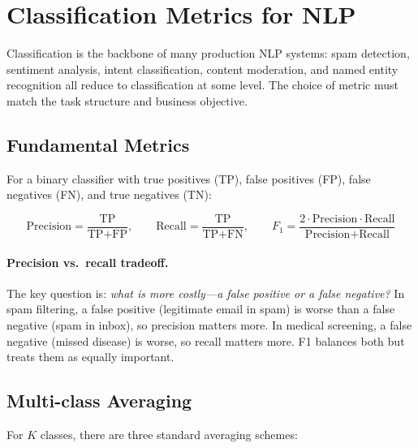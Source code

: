 \section{Classification Metrics for NLP}
\label{sec:classification_metrics}

Classification is the backbone of many production NLP systems: spam detection,
sentiment analysis, intent classification, content moderation, and named entity
recognition all reduce to classification at some level.  The choice of metric
must match the task structure and business objective.

\subsection{Fundamental Metrics}

For a binary classifier with true positives (TP), false positives (FP), false
negatives (FN), and true negatives (TN):

\[
    \text{Precision} = \frac{\text{TP}}{\text{TP} + \text{FP}}, \qquad
    \text{Recall} = \frac{\text{TP}}{\text{TP} + \text{FN}}, \qquad
    F_1 = \frac{2 \cdot \text{Precision} \cdot \text{Recall}}{\text{Precision} + \text{Recall}}
\]

\paragraph{Precision vs.\ recall tradeoff.}
The key question is: \emph{what is more costly---a false positive or a false
negative?}  In spam filtering, a false positive (legitimate email in spam) is
worse than a false negative (spam in inbox), so precision matters more.  In
medical screening, a false negative (missed disease) is worse, so recall matters
more.  F1 balances both but treats them as equally important.

\subsection{Multi-class Averaging}

For $K$ classes, there are three standard averaging schemes:

